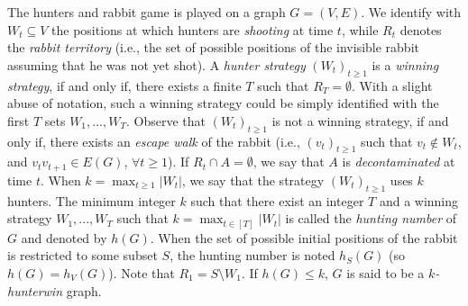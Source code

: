 \documentclass[runningheads]{llncs}
\newcommand{\ale}[1]{\textcolor{blue}{#1}}
\begin{document}
{The hunters and rabbit game is played on a graph $G=(V,E)$. We identify with $W_t \subseteq V$ the positions at which hunters are 
\emph{shooting} at time $t$,
 while  $R_t$ denotes the \emph{rabbit territory} (i.e., the set of possible positions of the {invisible} rabbit assuming that he was not yet shot). A \emph{hunter strategy} {$(W_t)_{t \geq 1}$} 
 is a  \emph{winning strategy}, if and only if, {there exists a finite $T$ such that}  $R_T = \emptyset$. {With a slight abuse of notation, such a winning strategy could be simply identified with the first $T$ sets $W_1,..., W_T$.}
 Observe that $(W_t)_{t \geq 1}$ %
 is not a winning strategy, if and only if, there exists an \emph{escape walk} of the rabbit (i.e., $(v_t)_{t \geq 1}$ such that $v_t \notin W_t$, and $v_t v_{t+1} \in E(G)$, $\forall t \ge 1$).
If $R_t \cap A =\emptyset$, we say that $A$ is \emph{decontaminated} at time $t$. When {$k=\max_{t \geq 1} |W_t|$, we say that the strategy $(W_t)_{t \geq 1}$} uses $k$ hunters. The minimum integer $k$ such that there exist an integer $T$ and a  winning  strategy $W_1,...,W_T$ {such that $k=\max_{t \in [T]} |W_t|$} is called the \emph{hunting number} of $G$ and denoted by $h(G)$.  When the set of possible initial positions of the rabbit is restricted to some subset $S$, the hunting number is noted $h_S(G)$ (so $ h(G) = h_V(G)$).  Note that $R_1 = S \setminus W_1$. If $h(G) \leq k$, $G$ is said to be a \emph{$k$-hunterwin} graph. }
\end{document}
